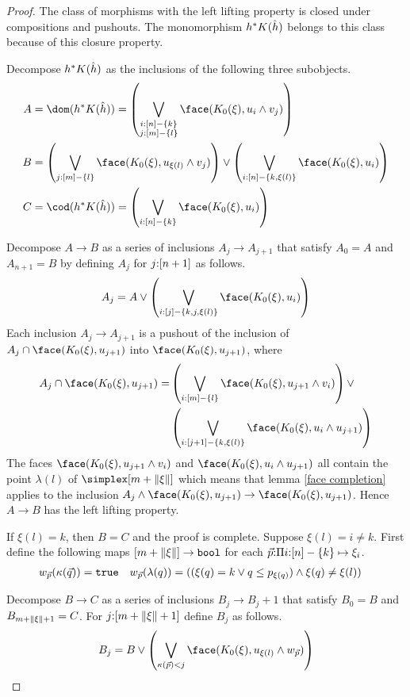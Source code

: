 \documentclass[csh.tex]{subfiles}
\begin{document}
\begin{proof}The class of morphisms with the left lifting property is closed under compositions and pushouts. The monomorphism $h^* K(\hat h)$ belongs to this class because of this closure property.

Decompose $h^* K(\hat h)$ as the inclusions of the following three subobjects.
\begin{align*}
A &=\dom(h\ri K(\hat h))=\left(\bigvee_{\substack{i\of[n]-\set{k}\\j\of [m]-\set l}}\face(K_0(\xi),u_i\land v_j)\right)\\
B &=\left(\bigvee_{j\of[m]-\set l}\face(K_0(\xi),u_{\xi(l)}\land v_j)\right)\vee \left(\bigvee_{i\of[n]-\set{k,\xi(l)}}\face(K_0(\xi),u_i)\right)\\
C &=\cod(h\ri K(\hat h))=\left(\bigvee_{i\of[n]-\set{k}} \face(K_0(\xi),u_i)\right)
\end{align*}

Decompose $A\to B$ as a series of inclusions $A_j\to A_{j+1}$ that satisfy $A_0=A$ and $A_{n+1}=B$ by defining $A_j$ for $j\mathord :[n+1]$ as follows.
\[ A_j = A\vee \left(\bigvee_{i\of[j]-\set{k,j,\xi(l)}}\face(K_0(\xi),u_i)\right) \]
Each inclusion $A_j\to A_{j+1}$ is a pushout of the inclusion of $A_j\cap \face(K_0(\xi),u_{j+1})$ into $\face(K_0(\xi),u_{j+1})$, where
\begin{align*} A_j\cap \face(K_0(\xi),u_{j+1}) = &\left(\bigvee_{i\of[m]-\set l}\face(K_0(\xi),u_{j+1}\land v_{i})\right)\vee \\
&\left(\bigvee_{i\of[j+1]-\set{k,\xi(l)}}\face(K_0(\xi),u_i\land u_{j+1})\right)\end{align*}
The faces $\face(K_0(\xi),u_{j+1}\land v_{i})$ and $\face(K_0(\xi),u_i\land u_{j+1})$ all contain the point $\lambda(l)$ of $\simplex[m+\norm\xi]$ which means that lemma \ref{face completion} applies to the inclusion $A_j\land \face(K_0(\xi),u_{j+1}) \to \face(K_0(\xi),u_{j+1})$. Hence $A\to B$ has the left lifting property.

If $\xi(l)=k$, then $B=C$ and the proof is complete. Suppose $\xi(l)=i\neq k$. First define the following maps $[m+\Vert \xi \Vert]\to\mathtt{bool}$ for each $\vec p \mathord :\Pi i\mathord : [n]-\left\{k\right\} \mapsto{\xi_i}$.
\begin{align*}
w_{\vec p}(\kappa(\vec q)) &= \mathtt{true} &
w_{\vec p}(\lambda(q)) &= ((\xi(q)=k\vee q\leq p_{\xi(q)})\land\xi(q)\neq \xi(l))
\end{align*}

Decompose $B\to C$ as a series of inclusions $B_j\to B_j+1$ that satisfy $B_0=B$ and $B_{m+\Vert \xi \Vert+1}=C$. For $j\mathord :[m+\Vert \xi \Vert+1]$ define $B_j$ as follows.
\[ B_j = B \vee \left(\bigvee_{\kappa(\vec p)<j} \face(K_0(\xi),u_{\xi(l)}\land w_{\vec p})\right)\]


\end{proof}
\end{document}
